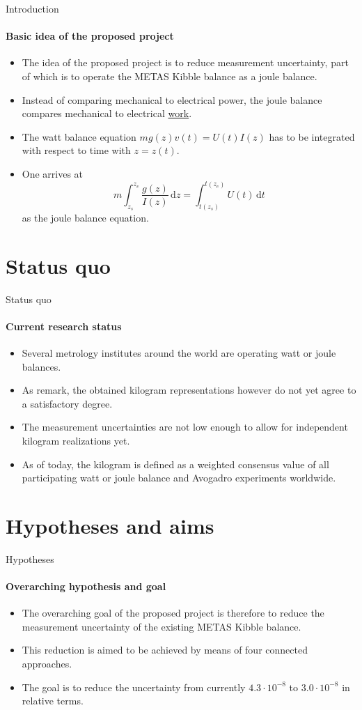 \documentclass{beamer}
\begin{document}
\begin{frame}[allowframebreaks]{Introduction}
\framesubtitle{Basic idea of the proposed project}
\begin{itemize}
    \item The idea of the proposed project is to reduce measurement uncertainty, part of which is to operate the METAS Kibble balance as a joule balance.
    \item Instead of comparing mechanical to electrical power, the joule balance compares mechanical to electrical \underline{work}.
    \item The watt balance equation $mg(z)v(t) = U(t)I(z)$ has to be integrated with respect to time with $z=z(t)$.
    \item One arrives at \begin{equation}
        m\int_{z_s}^{z_e}\frac{g(z)}{I(z)}\,\mathrm{d}z = \int_{t(z_s)}^{t(z_e)}U(t)\,\mathrm{d}t
    \end{equation} as the joule balance equation.
\end{itemize}
\end{frame}


\section{Status quo}
\begin{frame}[allowframebreaks]{Status quo}
\framesubtitle{Current research status}
\begin{itemize}
\item Several metrology institutes around the world are operating watt or joule balances.
\item As \cite{Stock_2023} remark, the obtained kilogram representations however do not yet agree to a satisfactory degree.
\item The measurement uncertainties are not low enough to allow for independent kilogram realizations yet.
\item As of today, the kilogram is defined as a weighted consensus value of all participating watt or joule balance and Avogadro experiments worldwide.
\end{itemize}
\end{frame}

\section{Hypotheses and aims}
\begin{frame}[allowframebreaks]{Hypotheses}
  \framesubtitle{Overarching hypothesis and goal}
    \begin{itemize}
        \item The overarching goal of the proposed project is therefore to reduce the measurement uncertainty of the existing METAS Kibble balance.
        \item This reduction is aimed to be achieved by means of four connected approaches.
        \item The goal is to reduce the uncertainty from currently $4.3\cdot 10^{-8}$ to $3.0\cdot 10^{-8}$ in relative terms.
    \end{itemize}
\end{frame}
\end{document}
